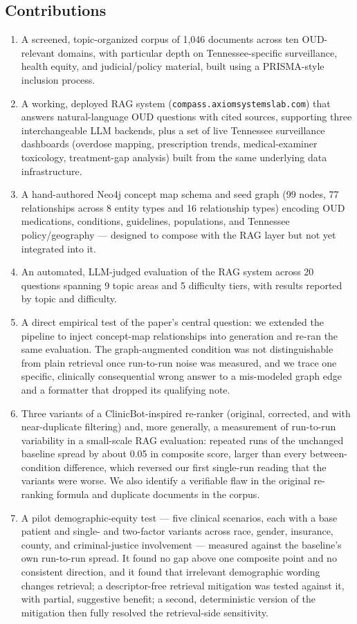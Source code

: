 \documentclass[11pt]{article}
\begin{document}
\subsection*{Contributions}
\begin{enumerate}[leftmargin=*]
  \item A screened, topic-organized corpus of 1{,}046 documents across ten OUD-relevant domains, with particular depth on Tennessee-specific surveillance, health equity, and judicial/policy material, built using a PRISMA-style inclusion process.
  \item A working, deployed RAG system (\texttt{compass.axiomsystemslab.com}) that answers natural-language OUD questions with cited sources, supporting three interchangeable LLM backends, plus a set of live Tennessee surveillance dashboards (overdose mapping, prescription trends, medical-examiner toxicology, treatment-gap analysis) built from the same underlying data infrastructure.
  \item A hand-authored Neo4j concept map schema and seed graph (99 nodes, 77 relationships across 8 entity types and 16 relationship types) encoding OUD medications, conditions, guidelines, populations, and Tennessee policy/geography --- designed to compose with the RAG layer but not yet integrated into it.
  \item An automated, LLM-judged evaluation of the RAG system across 20 questions spanning 9 topic areas and 5 difficulty tiers, with results reported by topic and difficulty.
  \item A direct empirical test of the paper's central question: we extended the pipeline to inject concept-map relationships into generation and re-ran the same evaluation. The graph-augmented condition was not distinguishable from plain retrieval once run-to-run noise was measured, and we trace one specific, clinically consequential wrong answer to a mis-modeled graph edge and a formatter that dropped its qualifying note.
  \item Three variants of a ClinicBot-inspired re-ranker (original, corrected, and with near-duplicate filtering) and, more generally, a measurement of run-to-run variability in a small-scale RAG evaluation: repeated runs of the unchanged baseline spread by about 0.05 in composite score, larger than every between-condition difference, which reversed our first single-run reading that the variants were worse. We also identify a verifiable flaw in the original re-ranking formula and duplicate documents in the corpus.
  \item A pilot demographic-equity test --- five clinical scenarios, each with a base patient and single- and two-factor variants across race, gender, insurance, county, and criminal-justice involvement --- measured against the baseline's own run-to-run spread. It found no gap above one composite point and no consistent direction, and it found that irrelevant demographic wording changes retrieval; a descriptor-free retrieval mitigation was tested against it, with partial, suggestive benefit; a second, deterministic version of the mitigation then fully resolved the retrieval-side sensitivity.
\end{enumerate}
\end{document}
